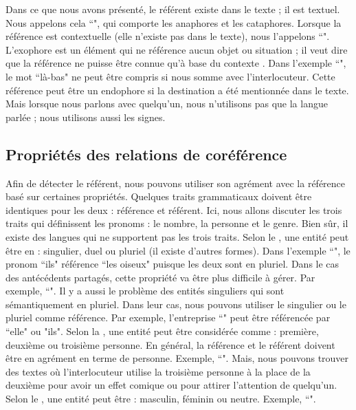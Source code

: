 \documentclass{KodeBook}
\begin{document}
Dans ce que nous avons présenté, le référent existe dans le texte ; il est textuel. 
Nous appelons cela ``", qui comporte les anaphores et les cataphores. 
Lorsque la référence est contextuelle (elle n'existe pas dans le texte), nous l'appelons ``".
L'exophore est un élément qui ne référence aucun objet ou situation ; il veut dire que la référence ne puisse être connue qu'à base du contexte \cite{2014-halliday-hasan}. 
Dans l'exemple ``", le mot ``là-bas" ne peut être compris si nous somme avec l'interlocuteur. 
Cette référence peut être un endophore si la destination a été mentionnée dans le texte. 
Mais lorsque nous parlons avec quelqu'un, nous n'utilisons pas que la langue parlée ; nous utilisons aussi les signes.

\subsection{Propriétés des relations de coréférence}

Afin de détecter le référent, nous pouvons utiliser son agrément avec la référence basé sur certaines propriétés. 
Quelques traits grammaticaux doivent être identiques pour les deux : référence et référent. 
Ici, nous allons discuter les trois traits qui définissent les pronoms : le nombre, la personne et le genre.
Bien sûr, il existe des langues qui ne supportent pas les trois traits. 
Selon le , une entité peut être en : singulier, duel ou pluriel (il existe d'autres formes). 
Dans l'exemple ``", le pronom ``ils" référence ``les oiseux" puisque les deux sont en pluriel. 
Dans le cas des antécédents partagés, cette propriété va être plus difficile à gérer.
Par exemple, ``".
Il y a aussi le problème des entités singuliers qui sont sémantiquement en pluriel. 
Dans leur cas, nous pouvons utiliser le singulier ou le pluriel comme référence. 
Par exemple, l'entreprise ``" peut être référencée par ``elle" ou "ils".
%
Selon la , une entité peut être considérée comme : première, deuxième ou troisième personne. 
En général, la référence et le référent doivent être en agrément en terme de personne.
Exemple,  ``".
Mais, nous pouvons trouver des textes où l'interlocuteur utilise la troisième personne à la place de la deuxième pour avoir un effet comique ou pour attirer l'attention de quelqu'un.
%
Selon le , une entité peut être : masculin, féminin ou neutre. 
Exemple, ``".
\end{document}
